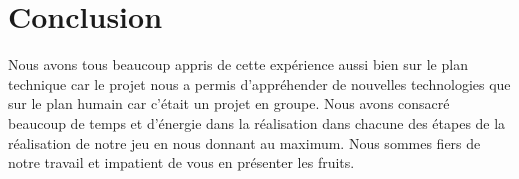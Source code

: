 \documentclass[12pt]{article}
\begin{document}
\newpage

\section*{Conclusion}

Nous avons tous beaucoup appris de cette expérience aussi bien sur le plan technique car le projet nous a permis d'appréhender de nouvelles technologies que sur le plan humain car c'était un projet en groupe. Nous avons consacré beaucoup de temps et d'énergie dans la réalisation dans chacune des étapes de la réalisation de notre jeu en nous donnant au maximum. Nous sommes fiers de notre travail et impatient de vous en présenter les fruits.

\newpage

\printglossaries
\end{document}
